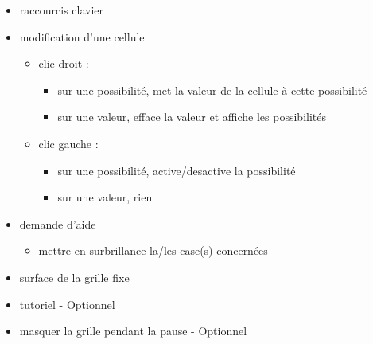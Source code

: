 \documentclass[a4paper,10pt]{report}
\begin{document}
\begin{itemize}
 \item raccourcis clavier
 \item modification d'une cellule
 \begin{itemize}
  \item clic droit :
  \begin{itemize}
   \item sur une possibilité, met la valeur de la cellule à cette possibilité
   \item sur une valeur, efface la valeur et affiche les possibilités
  \end{itemize}
  \item clic gauche :
  \begin{itemize}
   \item sur une possibilité, active/desactive la possibilité
   \item sur une valeur, rien
  \end{itemize}
 \end{itemize}
 \item demande d'aide
 \begin{itemize}
  \item mettre en surbrillance la/les case(s) concernées
 \end{itemize}
 \item surface de la grille fixe
 \item tutoriel - Optionnel
 \item masquer la grille pendant la pause - Optionnel
 
\end{itemize}
\end{document}
